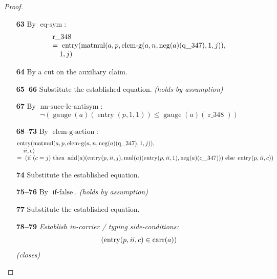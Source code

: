 \documentclass[11pt]{article}
\theoremstyle{plain}
\begin{document}
\begin{proof}
\begin{itemize}[leftmargin=2.8em, itemsep=4pt, parsep=1pt]
  \item[\textbf{63}] By $\operatorname{eq\text{-}sym}$:
\begin{equation*}
\begin{array}{@{}l@{}} \operatorname{r\_348} \\ =\; \operatorname{entry}(\operatorname{matmul}(a, p, \operatorname{elem\text{-}g}(a, n, \operatorname{neg}(a)(\operatorname{q\_347}), 1, j)), \\ \quad 1, j) \end{array}
\end{equation*}

  \item[\textbf{64}] By a cut on the auxiliary claim.
  \item[\textbf{65--66}] Substitute the established equation.  \emph{(holds by assumption)}
  \item[\textbf{67}] By $\operatorname{nn\text{-}succ\text{-}le\text{-}antisym}$:
\begin{equation*}
\neg (\operatorname{gauge}(a)(\operatorname{entry}(p, 1, 1)) \leq \operatorname{gauge}(a)(\operatorname{r\_348}))
\end{equation*}

  \item[\textbf{68--73}] By $\operatorname{elem\text{-}g\text{-}action}$:
\begin{equation*}
\begin{array}{@{}l@{}} \operatorname{entry}(\operatorname{matmul}(a, p, \operatorname{elem\text{-}g}(a, n, \operatorname{neg}(a)(\operatorname{q\_347}), 1, j)), \\ \quad \mathit{ii}, c) \\ =\; \left(\text{if }(c = j)\text{ then }\operatorname{add}(a)(\operatorname{entry}(p, \mathit{ii}, j), \operatorname{mul}(a)(\operatorname{entry}(p, \mathit{ii}, 1), \operatorname{neg}(a)(\operatorname{q\_347})))\text{ else }\operatorname{entry}(p, \mathit{ii}, c)\right) \end{array}
\end{equation*}

  \item[\textbf{74}] Substitute the established equation.
  \item[\textbf{75--76}] By $\operatorname{if\text{-}false}$.  \emph{(holds by assumption)}
  \item[\textbf{77}] Substitute the established equation.
  \item[\textbf{78--79}] \emph{Establish in-carrier / typing side-conditions:}
\begin{equation*}
\begin{array}{@{}l@{}}
(\operatorname{entry}(p, \mathit{ii}, c) \in \operatorname{carr}(a))
\end{array}
\end{equation*}
  \emph{(closes)}
\end{itemize}
\end{proof}

\bigskip
\end{document}
